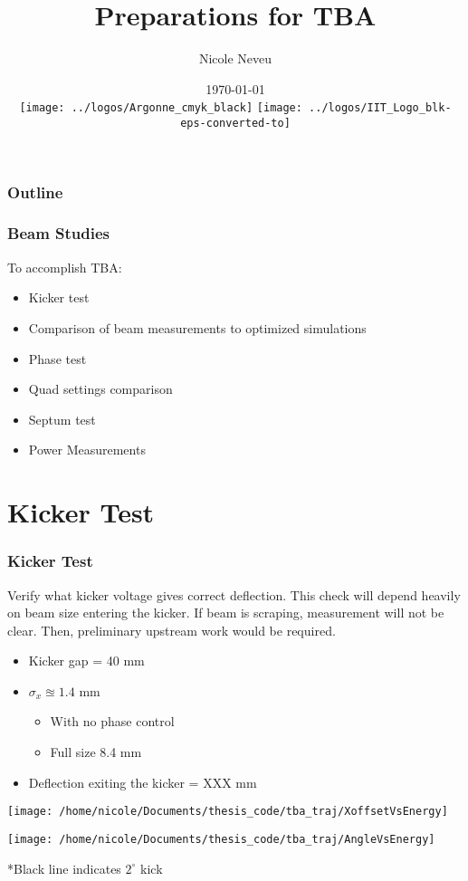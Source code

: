 \documentclass[professionalfonts,t]{beamer}
\title[May 2018]{Preparations for TBA}
\author[N.Neveu]{{\Large Nicole Neveu}}
\institute[ANL, IIT] %
{   Illinois Institute of Technology \\
	Argonne National Laboratory \\
    \url{nneveu@anl.gov} 
}
\date{ \today \\
\texttt{[image: ../logos/Argonne\_cmyk\_black]}%
\hfill \hfill \hfill%
\texttt{[image: ../logos/IIT\_Logo\_blk-eps-converted-to]}%
}
\begin{document}
\begin{frame}
  \titlepage
\end{frame}
\begin{frame}
	\frametitle{Outline}
	\tableofcontents
\end{frame}

\begin{frame}
\frametitle{Beam Studies}
	To accomplish TBA:
	\vspace{0.5em}

		\begin{itemize}
			\item Kicker test
			\item Comparison of beam measurements to optimized simulations
			\item Phase test
			\item Quad settings comparison
			\item Septum test
			\item Power Measurements
		\end{itemize}
	
\end{frame}

\section{Kicker Test}
\begin{frame}
\frametitle{Kicker Test}
Verify what kicker voltage gives correct deflection. 
This check will depend heavily on beam size entering the kicker.
If beam is scraping, measurement will not be clear. Then, 
preliminary upstream work would be required.
\vspace{0.2em}



\end{frame}


\begin{frame}
	\begin{itemize}
	\item Kicker gap = 40 mm
	\item $\sigma_x \approxeq 1.4$ mm
	\begin{itemize}
		\item With no phase control
		\item Full size 8.4 mm
	\end{itemize}
	\item Deflection exiting the kicker = XXX mm
\end{itemize}
\begin{minipage}{0.45\textwidth}
		\centering
\texttt{[image: /home/nicole/Documents/thesis\_code/tba\_traj/XoffsetVsEnergy]}
	
\end{minipage}
	\begin{minipage}{0.45\textwidth}
		\centering
		\texttt{[image: /home/nicole/Documents/thesis\_code/tba\_traj/AngleVsEnergy]}
	\end{minipage}
\centering
*Black line indicates $2^{\circ}$ kick
\end{frame}
\end{document}
